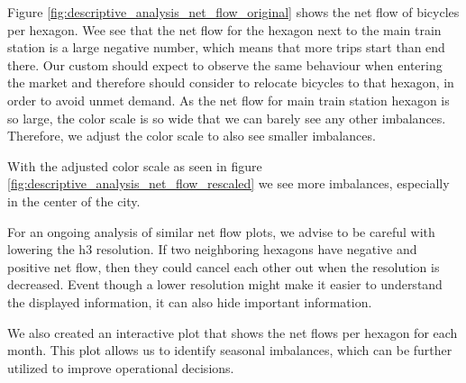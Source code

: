 Figure \ref{fig:descriptive_analysis_net_flow_original} shows the net flow of
bicycles per hexagon. Wee see that the net flow for the hexagon next to the
main train station is a large negative number, which means that more trips
start than end there. Our custom should expect to observe the same behaviour
when entering the market and therefore should consider to relocate bicycles
to that hexagon, in order to avoid unmet demand.
As the net flow for main train station hexagon is so large, the color scale is
so wide that we can barely see any other imbalances.
Therefore, we adjust the color scale to also see smaller imbalances.

With the adjusted color scale as seen in figure
\ref{fig:descriptive_analysis_net_flow_rescaled} we see more imbalances,
especially in the center of the city.

For an ongoing analysis of similar net flow plots, we advise to be careful with lowering the h3 resolution.
If two neighboring hexagons have negative and positive net flow, then they could cancel each other out when the resolution is decreased.
Event though a lower resolution might make it easier to understand the displayed information, it can also hide important information.

We also created an interactive plot that shows the net flows per hexagon for each month.
This plot allows us to identify seasonal imbalances, which can be further utilized to improve operational decisions.

